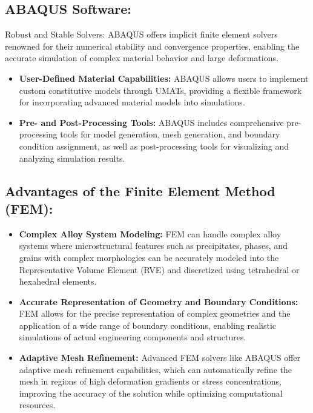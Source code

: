 \subsection{ABAQUS Software:}
Robust and Stable Solvers: ABAQUS offers implicit finite element solvers renowned for their numerical stability and convergence properties, enabling the accurate simulation of complex material behavior and large deformations.

\begin{itemize}
    \item \textbf{User-Defined Material Capabilities:} ABAQUS allows users to implement custom constitutive models through UMATs, providing a flexible framework for incorporating advanced material models into simulations.
    \item \textbf{Pre- and Post-Processing Tools:} ABAQUS includes comprehensive pre-processing tools for model generation, mesh generation, and boundary condition assignment, as well as post-processing tools for visualizing and analyzing simulation results.
\end{itemize}

\subsection{Advantages of the Finite Element Method (FEM):}

\begin{itemize}
    \item \textbf{Complex Alloy System Modeling:} FEM can handle complex alloy systems where microstructural features such as precipitates, phases, and grains with complex morphologies can be accurately modeled into the Representative Volume Element (RVE) and discretized using tetrahedral or hexahedral elements.
    \item \textbf{Accurate Representation of Geometry and Boundary Conditions:} FEM allows for the precise representation of complex geometries and the application of a wide range of boundary conditions, enabling realistic simulations of actual engineering components and structures.
    \item \textbf{Adaptive Mesh Refinement:} Advanced FEM solvers like ABAQUS offer adaptive mesh refinement capabilities, which can automatically refine the mesh in regions of high deformation gradients or stress concentrations, improving the accuracy of the solution while optimizing computational resources.
\end{itemize}

